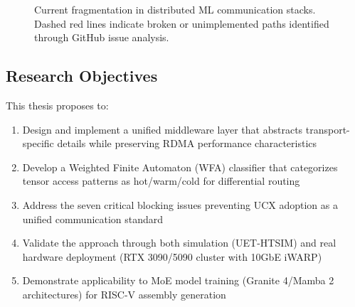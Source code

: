 \documentclass[11pt,letterpaper]{article}
\theoremstyle{definition}
\begin{document}
\begin{figure}[htbp]
\caption{Current fragmentation in distributed ML communication stacks. Dashed red lines indicate broken or unimplemented paths identified through GitHub issue analysis.}
\label{fig:fragmentation-overview}
\end{figure}

\subsection{Research Objectives}

This thesis proposes to:

\begin{enumerate}[label=\textbf{O\arabic*.}]
    \item Design and implement a unified middleware layer that abstracts transport-specific details while preserving RDMA performance characteristics
    \item Develop a Weighted Finite Automaton (WFA) classifier that categorizes tensor access patterns as hot/warm/cold for differential routing
    \item Address the seven critical blocking issues preventing UCX adoption as a unified communication standard
    \item Validate the approach through both simulation (UET-HTSIM) and real hardware deployment (RTX 3090/5090 cluster with 10GbE iWARP)
    \item Demonstrate applicability to MoE model training (Granite 4/Mamba 2 architectures) for RISC-V assembly generation
\end{enumerate}
\end{document}
